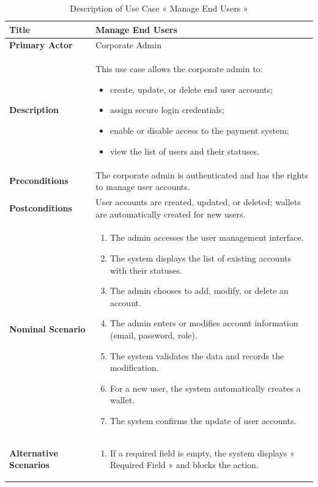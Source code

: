 \begin{longtable}{|p{4cm}|p{10cm}|}
        \caption{Description of Use Case « Manage End Users »}
  \label{tab:uc_manage_end_users} \\
 \hline
  \textbf{Title} & Manage End Users \\ \hline
  \textbf{Primary Actor} & Corporate Admin \\ \hline
  \textbf{Description} & This use case allows the corporate admin to:
    \begin{itemize}[nosep,leftmargin=*]
      \item create, update, or delete end user accounts;
      \item assign secure login credentials;
      \item enable or disable access to the payment system;
      \item view the list of users and their statuses.
    \end{itemize} \\ \hline
        \textbf{Preconditions} & The corporate admin is authenticated and has the rights to manage user accounts. \\ \hline
    \textbf{Postconditions} & User accounts are created, updated, or deleted; wallets are automatically created for new users. \\ \hline
    \textbf{Nominal Scenario} &
      \begin{enumerate}[nosep,leftmargin=*]
        \item The admin accesses the user management interface.
        \item The system displays the list of existing accounts with their statuses.
        \item The admin chooses to add, modify, or delete an account.
        \item The admin enters or modifies account information (email, password, role).
        \item The system validates the data and records the modification.
        \item For a new user, the system automatically creates a wallet.
        \item The system confirms the update of user accounts.
      \end{enumerate} \\ \hline
    \textbf{Alternative Scenarios} &
      \begin{enumerate}[nosep,leftmargin=*]
        \item If a required field is empty, the system displays « Required Field » and blocks the action.

\end{enumerate}
\end{longtable}
